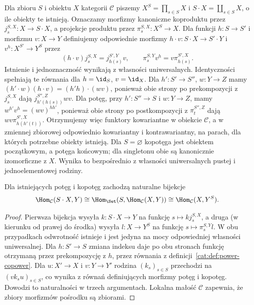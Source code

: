 \begin{definicja}\label{cat:def:power-copower}
Dla zbioru $S$ i obiektu $X$ kategorii $\mathcal C$ piszemy $X^S=\prod_{s\in S}X$ i $S\cdot X=\coprod_{s\in S}X$, o ile obiekty te istnieją. Oznaczamy morfizmy kanoniczne koproduktu przez $j_s^{S,X}:X\to S\cdot X$, a projekcje produktu przez $\pi_s^{S,X}:X^S\to X$. Dla funkcji $h:S\to S'$ i morfizmu $v:X\to Y$ definiujemy odpowiednie morfizmy $h\cdot v:S\cdot X\to S'\cdot Y$ i $v^h:X^{S'}\to Y^S$ przez
\[
 (h\cdot v)j_s^{S,X}=j_{h(s)}^{S',Y}v,\qquad
 \pi_s^{S,Y}v^h=v\pi_{h(s)}^{S',X}.
\]
Istnienie i jednoznaczność wynikają z własności uniwersalnych. Identyczności spełniają te równania dla $h=\id_S$, $v=\id_X$. Dla $h':S'\to S''$, $w:Y\to Z$ mamy $(h'\cdot w)(h\cdot v)=(h'h)\cdot(wv)$, ponieważ obie strony po prekompozycji z $j_s^{S,X}$ dają $j_{h'(h(s))}^{S'',Z}wv$. Dla potęg, przy $h':S''\to S$ i $w:Y\to Z$, mamy $w^{h'}v^h=(wv)^{hh'}$, ponieważ obie strony po postkompozycji z $\pi_t^{S'',Z}$ dają $wv\pi_{h(h'(t))}^{S',X}$. Otrzymujemy więc funktory kowariantne w obiekcie $\mathcal C$, a w zmiennej zbiorowej odpowiednio kowariantny i kontrawariantny, na parach, dla których potrzebne obiekty istnieją. Dla $S=\varnothing$ kopotęga jest obiektem początkowym, a potęga końcowym; dla singletonu obie są kanonicznie izomorficzne z $X$. Wynika to bezpośrednio z własności uniwersalnych pustej i jednoelementowej rodziny.
\end{definicja}
\begin{stwierdzenie}\label{cat:prop:power-copower-hom}
Dla istniejących potęg i kopotęg zachodzą naturalne bijekcje
\[
 \Hom_{\mathcal C}(S\cdot X,Y)
 \cong\Hom_{\Set}(S,\Hom_{\mathcal C}(X,Y))
 \cong\Hom_{\mathcal C}(X,Y^S).
\]
\end{stwierdzenie}
\begin{proof}
Pierwsza bijekcja wysyła $k:S\cdot X\to Y$ na funkcję $s\mapsto kj_s^{S,X}$, a druga (w kierunku od prawej do środka) wysyła $l:X\to Y^S$ na funkcję $s\mapsto\pi_s^{S,Y}l$. W obu przypadkach odwrotność istnieje i jest jedyna na mocy odpowiedniej własności uniwersalnej. Dla $h:S'\to S$ zmiana indeksu daje po obu stronach funkcję otrzymaną przez prekompozycję z $h$, przez równania z definicji~\ref{cat:def:power-copower}. Dla $u:X'\to X$ i $v:Y\to Y'$ rodzina $(k_s)_{s\in S}$ przechodzi na $(vk_su)_{s\in S}$, co wynika z równań definiujących morfizmy potęg i kopotęg. Dowodzi to naturalności w trzech argumentach. Lokalna małość $\mathcal C$ zapewnia, że zbiory morfizmów pośrodku są zbiorami.
\end{proof}
